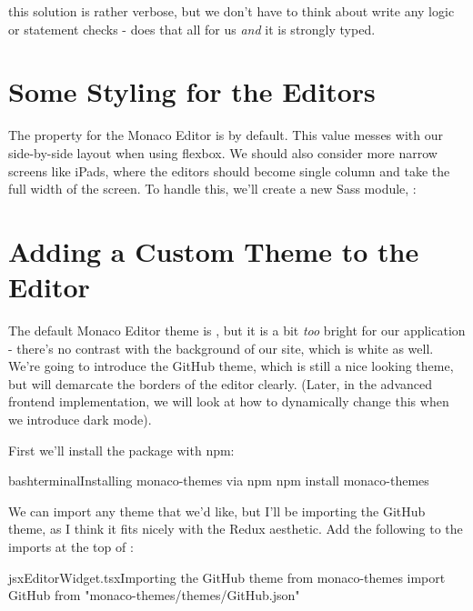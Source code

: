 \documentclass[a4paper,headinclude=on,footinclude=on,12pt,oneside]{scrbook}
\begin{document}
this solution is rather verbose, but we don't have to think about write any  logic or  statement checks -  does that all for us \textit{and} it is strongly typed.

\section{Some Styling for the Editors}

The  property for the Monaco Editor is  by default. This value messes with our side-by-side layout when using flexbox. We should also consider more narrow screens like iPads, where the editors should become single column and take the full width of the screen. To handle this, we'll create a new Sass module, :


\section{Adding a Custom Theme to the Editor}

The default Monaco Editor theme is , but it is a bit \textit{too} bright for our application - there's no contrast with the background of our site, which is white as well. We're going to introduce the GitHub theme, which is still a nice looking theme, but will demarcate the borders of the editor clearly. (Later, in the advanced frontend implementation, we will look at how to dynamically change this when we introduce dark mode).

First we'll install the package  with npm:

\begin{codeInput}{bash}{terminal}{Installing monaco-themes via npm}
npm install monaco-themes
\end{codeInput}

We can import any theme that we'd like, but I'll be importing the GitHub theme, as I think it fits nicely with the Redux aesthetic. Add the following to the imports at the top of :

\begin{codeInput}{jsx}{EditorWidget.tsx}{Importing the GitHub theme from monaco-themes}
import GitHub from "monaco-themes/themes/GitHub.json"
\end{codeInput}
\end{document}
